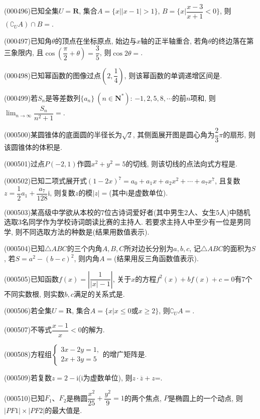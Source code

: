 \item (000496)已知全集$U=\mathbf{R}$, 集合$A=\{x||x-1|>1\}$, $B=\{x|\dfrac{x-3}{x+1}<0\}$, 则$(\complement_U A)\cap B=$.
\item (000497)已知角$\theta$的顶点在坐标原点, 始边与$x$轴的正半轴重合, 若角$\theta$的终边落在第三象限内, 且$\cos(\dfrac\pi 2+\theta)=\dfrac35$, 则$\cos 2\theta=$.
\item (000498)已知幂函数的图像过点$(2,\dfrac14)$, 则该幂函数的单调递增区间是.
\item (000499)若$S_n$是等差数列$\{a_n\}\ (n\in \mathbf{N}^*)$: $-1,2,5,8,\cdots$的前$n$项和, 则$\displaystyle\lim_{n\to\infty}\dfrac{{S_n}}{{n^2}+1}=$.
\item (000500)某圆锥体的底面圆的半径长为$\sqrt2$, 其侧面展开图是圆心角为$\dfrac23\pi$的扇形, 则该圆锥体的体积是.
\item (000501)过点$P(-2,1)$作圆$x^2+y^2=5$的切线, 则该切线的点法向式方程是.
\item (000502)已知二项式展开式$(1-2x)^7=a_0+a_1x+a_2x^2+\cdots +a_7x^7$, 且复数$z=\dfrac12a_1+\dfrac{a_7}{128}\mathrm{i}$, 则复数$z$的模$|z|=$(其中$\mathrm{i}$是虚数单位).
\item (000503)某高级中学欲从本校的$7$位古诗词爱好者(其中男生$2$人、女生$5$人)中随机选取$3$名同学作为学校诗词朗读比赛的主持人. 若要求主持人中至少有一位是男同学, 则不同选取方法的种数是(结果用数值表示).
\item (000504)已知$\triangle ABC$的三个内角$A,B,C$所对边长分别为$a,b,c$, 记$\triangle ABC$的面积为$S$, 若$S=a^2-(b-c)^2$, 则内角$A=$(结果用反三角函数值表示).
\item (000505)已知函数$f(x)=\left|\dfrac1{|x|-1}\right|$, 关于$x$的方程$f^2(x)+bf(x)+c=0$有$7$个不同实数根, 则实数$b,c$满足的关系式是.
\item (000506)若全集$U=\mathbf{R}$, 集合$A=\{x|x\le 0\text{或} x\ge 2\}$, 则$\complement_U A=$.
\item (000507)不等式$\dfrac{x-1}x<0$的解为.
\item (000508)方程组$\begin{cases} 3x-2y=1, \\ 2x+3y=5 \end{cases}$的增广矩阵是.
\item (000509)若复数$z=2-\mathrm{i}$($\mathrm{i}$为虚数单位), 则$z\cdot \overline z+z$=.
\item (000510)已知$F_1$、$F_2$是椭圆$\dfrac{x^2}{25}+\dfrac{y^2}9=1$的两个焦点, $P$是椭圆上的一个动点, 则$|PF1|\times |PF2|$的最大值是.
